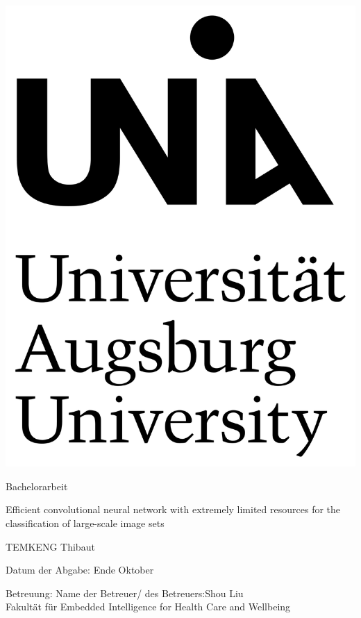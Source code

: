 \documentclass[12pt,a4paper]{scrartcl}
\numberwithin{equation}{section}
\begin{document}
  \pagestyle{empty}

  \begin{titlepage}

    \includegraphics[scale=0.05]{logo_uni} 
    \vspace*{2cm} 

 \begin{center} \large 
    
    Bachelorarbeit
    \vspace*{2cm}

    
    {\LARGE Efficient convolutional neural network with extremely limited resources 
    for the classification of large-scale image sets}
    \vspace*{2.5cm}

	TEMKENG Thibaut
    \vspace*{1.5cm}

    Datum der Abgabe: Ende Oktober
    \vspace*{4.5cm}


    Betreuung: Name der Betreuer/ des Betreuers:Shou Liu \\[1cm]
    Fakultät für Embedded Intelligence for Health Care and Wellbeing \\[1cm]

  \end{center}
\end{titlepage}
\end{document}
